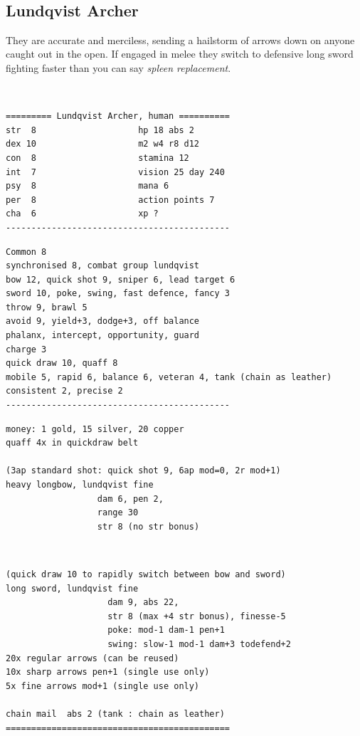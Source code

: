 \


\subsection*{Lundqvist Archer}

They are accurate and merciless, sending a hailstorm of arrows down on anyone caught out in the open. If engaged in melee they switch to defensive long sword fighting faster than you can say \emph{spleen replacement}.

\

\goodbreak \small \begin{samepage} \begin{verbatim}
========= Lundqvist Archer, human ==========
str  8                    hp 18 abs 2
dex 10                    m2 w4 r8 d12
con  8                    stamina 12
int  7                    vision 25 day 240
psy  8                    mana 6
per  8                    action points 7
cha  6                    xp ?
--------------------------------------------
\end{verbatim} \end{samepage} \goodbreak \begin{samepage} \begin{verbatim}
Common 8
synchronised 8, combat group lundqvist
bow 12, quick shot 9, sniper 6, lead target 6
sword 10, poke, swing, fast defence, fancy 3
throw 9, brawl 5
avoid 9, yield+3, dodge+3, off balance
phalanx, intercept, opportunity, guard
charge 3
quick draw 10, quaff 8
mobile 5, rapid 6, balance 6, veteran 4, tank (chain as leather)
consistent 2, precise 2
--------------------------------------------
\end{verbatim} \end{samepage} \goodbreak \begin{samepage} \begin{verbatim}
money: 1 gold, 15 silver, 20 copper
quaff 4x in quickdraw belt

(3ap standard shot: quick shot 9, 6ap mod=0, 2r mod+1)
heavy longbow, lundqvist fine      
                  dam 6, pen 2,
                  range 30
                  str 8 (no str bonus)
\end{verbatim} \end{samepage}   \   \goodbreak \begin{samepage} \begin{verbatim}
(quick draw 10 to rapidly switch between bow and sword)
long sword, lundqvist fine
                    dam 9, abs 22,
                    str 8 (max +4 str bonus), finesse-5
                    poke: mod-1 dam-1 pen+1
                    swing: slow-1 mod-1 dam+3 todefend+2
20x regular arrows (can be reused)
10x sharp arrows pen+1 (single use only)
5x fine arrows mod+1 (single use only)

chain mail  abs 2 (tank : chain as leather)
============================================
\end{verbatim} \end{samepage} \normalsize
